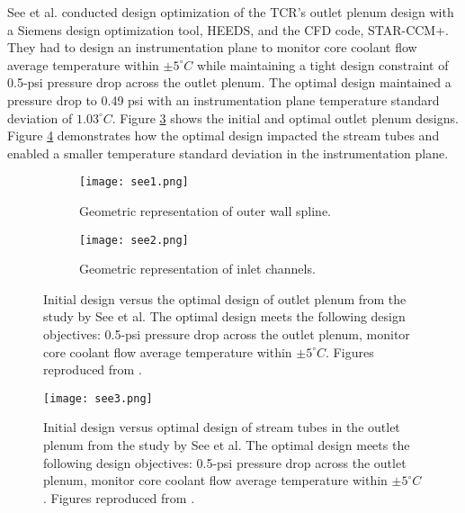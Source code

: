 See et al. \cite{see_design_2022} conducted design optimization of the 
\gls{TCR}'s outlet plenum design with a Siemens design optimization tool, HEEDS,
and the \gls{CFD} code, STAR-CCM+. 
They had to design an instrumentation plane to monitor core coolant flow average 
temperature within $\pm 5 ^{\circ}C$ while maintaining a tight design 
constraint of 0.5-psi pressure drop across the outlet plenum.
The optimal design maintained a pressure drop to 0.49 psi with an instrumentation 
plane temperature standard deviation of $1.03^{\circ}C$. 
Figure \ref{fig:compare-outlet-plenum} shows the initial and optimal outlet plenum 
designs. 
Figure \ref{fig:see3} demonstrates how the optimal design impacted the stream 
tubes and enabled a smaller temperature standard deviation in the 
instrumentation plane. 
\begin{figure}[htb!]
    \centering
    \begin{subfigure}{0.49\textwidth}
        \texttt{[image: see1.png]}
        \caption{Geometric representation of outer wall spline.}
        \label{fig:see1} 
    \end{subfigure}
    \begin{subfigure}{0.49\textwidth}
        \texttt{[image: see2.png]}
        \caption{Geometric representation of inlet channels.}
        \label{fig:see2} 
    \end{subfigure}
    \caption{Initial design versus the optimal design of outlet plenum from the study 
    by See et al. 
    The optimal design meets the following design objectives: 0.5-psi pressure drop 
    across the outlet plenum, monitor core coolant flow average temperature within 
    $\pm 5 ^{\circ}C$.
    Figures reproduced from \cite{betzler_transformational_2020}.}
    \label{fig:compare-outlet-plenum}
\end{figure}
\begin{figure}[htb!]
    \centering
    \texttt{[image: see3.png]} 
    \caption{Initial design versus optimal design of stream tubes in the outlet 
    plenum from the study by See et al. 
    The optimal design meets the following design objectives: 0.5-psi pressure 
    drop across the outlet plenum, monitor core coolant flow average temperature 
    within $\pm 5 ^{\circ}C$.
    Figures reproduced from \cite{see_design_2022}.}
    \label{fig:see3}
\end{figure}

